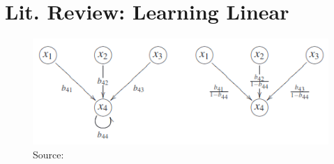 \documentclass[letterpaper,10pt]{article}
\begin{document}

\section{Lit. Review: Learning Linear \cite{LearningLinear}} \label{section:learninglinear}




\begin{figure}
\centering
\includegraphics[width=.6\linewidth]{pics/self_cycles.png}
\caption{Source: \cite{LearningLinear}}
\label{fig:SelfCycles}
\end{figure}




\end{document}
